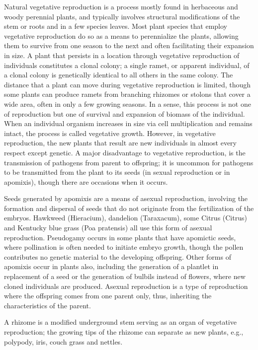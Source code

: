 Natural vegetative reproduction is a process mostly found in herbaceous and woody perennial plants, and typically involves structural modifications of the stem or roots and in a few species leaves. Most plant species that employ vegetative reproduction do so as a means to perennialize the plants, allowing them to survive from one season to the next and often facilitating their expansion in size. A plant that persists in a location through vegetative reproduction of individuals constitutes a clonal colony; a single ramet, or apparent individual, of a clonal colony is genetically identical to all others in the same colony. The distance that a plant can move during vegetative reproduction is limited, though some plants can produce ramets from branching rhizomes or stolons that cover a wide area, often in only a few growing seasons. In a sense, this process is not one of reproduction but one of survival and expansion of biomass of the individual. When an individual organism increases in size via cell multiplication and remains intact, the process is called vegetative growth. However, in vegetative reproduction, the new plants that result are new individuals in almost every respect except genetic. A major disadvantage to vegetative reproduction, is the transmission of pathogens from parent to offspring; it is uncommon for pathogens to be transmitted from the plant to its seeds (in sexual reproduction or in apomixis), though there are occasions when it occurs.

Seeds generated by apomixis are a means of asexual reproduction, involving the formation and dispersal of seeds that do not originate from the fertilization of the embryos. Hawkweed (Hieracium), dandelion (Taraxacum), some Citrus (Citrus) and Kentucky blue grass (Poa pratensis) all use this form of asexual reproduction. Pseudogamy occurs in some plants that have apomictic seeds, where pollination is often needed to initiate embryo growth, though the pollen contributes no genetic material to the developing offspring. Other forms of apomixis occur in plants also, including the generation of a plantlet in replacement of a seed or the generation of bulbils instead of flowers, where new cloned individuals are produced. Asexual reproduction is a type of reproduction where the offspring comes from one parent only, thus, inheriting the characteristics of the parent.

A rhizome is a modified underground stem serving as an organ of vegetative reproduction; the growing tips of the rhizome can separate as new plants, e.g., polypody, iris, couch grass and nettles.

